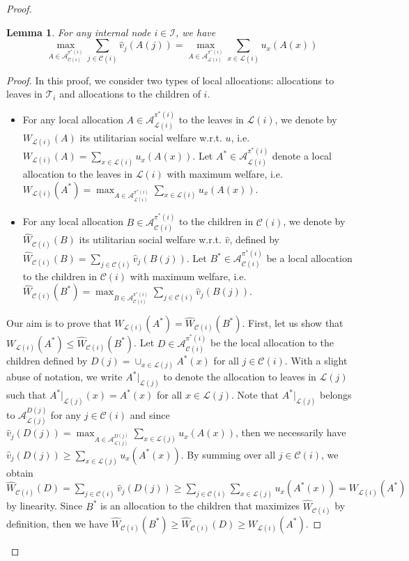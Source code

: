 \documentclass[]{article}
\newtheorem{lemma}{Lemma}
\newcommand{\tree}{\mathcal{T}}
\newcommand{\children}{\mathcal{C}}
\newcommand{\leaves}{\mathcal{L}}
\newcommand{\internal}{\mathcal{I}}
\newcommand{\allocations}{\mathcal{A}}
\begin{document}
\begin{proof}
\begin{lemma} \label{lemma: usw children = usw leaves}
For any internal node $i \in \internal$, we have
 $$\max_{A \in \allocations^{\pi^*(i)}_{\children(i)}} \sum_{j \in \children(i)} \hat{v}_j(A(j)) = \max_{A \in \allocations^{\pi^*(i)}_{\leaves(i)}} \sum_{x \in \leaves(i)} u_x(A(x))$$
\end{lemma}

\begin{proof}
In this proof, we consider two types of local allocations: allocations to leaves in $\tree_i$ and  allocations to the children of $i$. 
\begin{itemize}
    \item For any local allocation  $A \in \allocations^{\pi^*(i)}_{\leaves(i)}$ to the leaves in $\leaves(i)$, we denote by $W_{\leaves(i)}(A)$ its utilitarian social welfare w.r.t. $u$, i.e. $W_{\leaves(i)}(A) = \sum_{x \in \leaves(i)} u_x(A(x))$. Let $A^* \in \allocations^{\pi^*(i)}_{\leaves(i)}$ denote a local allocation to the leaves in $\leaves(i)$ with maximum welfare, i.e. $W_{\leaves(i)}(A^*) = \max_{A \in \allocations^{\pi^*(i)}_{\leaves(i)}} \sum_{x \in \leaves(i)} u_x(A(x))$.
    \item For any local allocation $B \in \allocations^{\pi^*(i)}_{\children(i)}$ to the children in $\children(i)$, we denote by $\hat{W}_{\children(i)}(B)$ its utilitarian social welfare w.r.t. $\hat{v}$, defined by $\hat{W}_{\children(i)}(B) = \sum_{j \in \children(i)} \hat{v}_j(B(j))$. Let $B^* \in \allocations^{\pi^*(i)}_{\children(i)}$ be a local allocation to the children in $\children(i)$ with maximum welfare, i.e. $\hat{W}_{\children(i)}(B^*) = \max_{B \in \allocations^{\pi^*(i)}_{\children(i)}} \sum_{j \in \children(i)} \hat{v}_j(B(j))$.
\end{itemize}
Our aim is to prove that $W_{\leaves(i)}(A^*) = \hat{W}_{\children(i)}(B^*)$. First, let us show that $W_{\leaves(i)}(A^*) \le \hat{W}_{\children(i)}(B^*)$. Let $D \in \allocations^{\pi^*(i)}_{\children(i)}$ be the local allocation to the children defined by $D(j) = \cup_{x \in \leaves(j)} A^*(x)$ for all $j \in \children(i)$. 
With a slight abuse of notation, we write $A^*\vert_{\leaves(j)}$ to denote the allocation to leaves in $\leaves(j)$ such that $A^*\vert_{\leaves(j)}(x) = A^*(x)$ for all $x \in \leaves(j)$. Note that $A^*\vert_{\leaves(j)}$ belongs to $ \allocations^{D(j)}_{\leaves(j)}$ for any $j \in \children(i)$ and since 
$\hat{v}_j(D(j)) = \max_{A \in \allocations^{D(j)}_{\leaves(j)}} \sum_{x \in \leaves(j)} u_x(A(x))$, then we necessarily have  $\hat{v}_j(D(j)) \geq \sum_{x \in \leaves(j)} u_x(A^*(x))$. By summing over all $j\in \children(i)$, we obtain $\hat{W}_{\children(i)}(D) = \sum_{j \in \children(i)} \hat{v}_j(D(j)) \geq \sum_{j \in \children(i)} \sum_{x \in \leaves(j)} u_x(A^*(x)) = W_{\leaves(i)}(A^*)$ by linearity. Since $B^*$ is an allocation to the children that maximizes $\hat{W}_{\children(i)}$ by definition, then we have $\hat{W}_{\children(i)}(B^*) \ge \hat{W}_{\children(i)}(D) \ge W_{\leaves(i)}(A^*)$.


\end{proof}
\end{proof}
\end{document}
